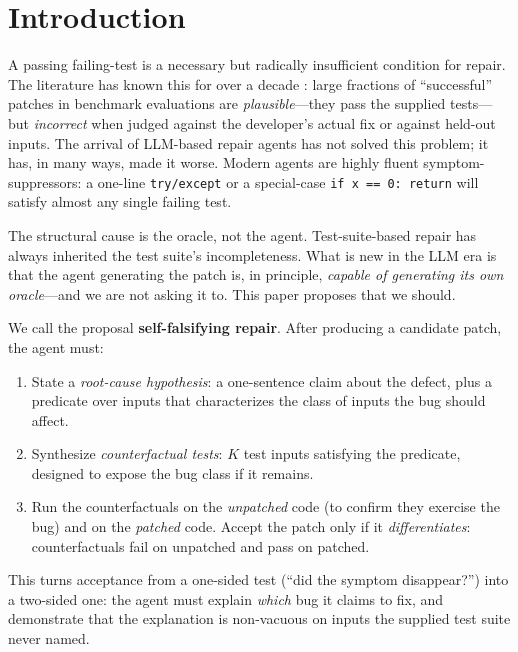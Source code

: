 \documentclass[sigconf,review,anonymous,nonacm]{acmart}
\begin{document}


\maketitle

\section{Introduction}
\label{sec:intro}

A passing failing-test is a necessary but radically insufficient condition
for repair. The literature has known this for over a decade
\cite{qi2015analysis,smith2015cure,le2019reliability}: large fractions of
``successful'' patches in benchmark evaluations are
\emph{plausible}---they pass the supplied tests---but \emph{incorrect}
when judged against the developer's actual fix or against held-out
inputs. The arrival of LLM-based repair agents
\cite{xia2024agentless,yang2024sweagent} has not solved this problem; it
has, in many ways, made it worse. Modern agents are highly fluent symptom-
suppressors: a one-line \texttt{try/except} or a special-case
\texttt{if x == 0: return} will satisfy almost any single failing test.

The structural cause is the oracle, not the agent. Test-suite-based
repair has always inherited the test suite's incompleteness. What is new
in the LLM era is that the agent generating the patch is, in principle,
\emph{capable of generating its own oracle}---and we are not asking it
to. This paper proposes that we should.

We call the proposal \textbf{self-falsifying repair}. After producing a
candidate patch, the agent must:
\begin{enumerate}
\item State a \emph{root-cause hypothesis}: a one-sentence claim about
the defect, plus a predicate over inputs that characterizes the class of
inputs the bug should affect.
\item Synthesize \emph{counterfactual tests}: $K$ test inputs satisfying
the predicate, designed to expose the bug class if it remains.
\item Run the counterfactuals on the \emph{unpatched} code (to confirm
they exercise the bug) and on the \emph{patched} code. Accept the patch
only if it \emph{differentiates}: counterfactuals fail on unpatched and
pass on patched.
\end{enumerate}
This turns acceptance from a one-sided test (``did the symptom
disappear?'') into a two-sided one: the agent must explain
\emph{which} bug it claims to fix, and demonstrate that the explanation
is non-vacuous on inputs the supplied test suite never named.
\end{document}
